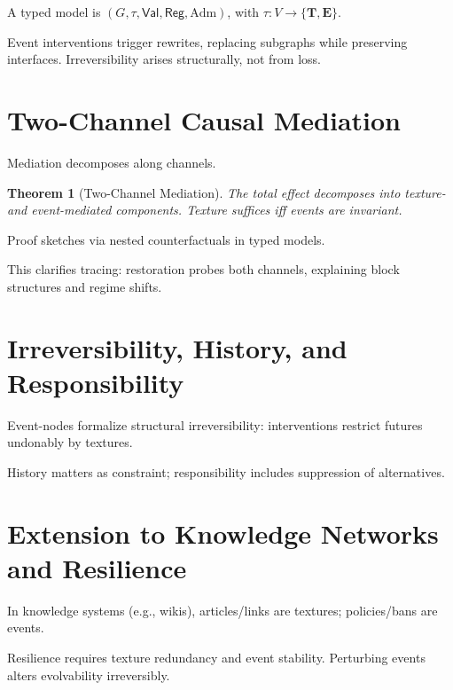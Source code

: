 \documentclass[11pt]{article}
\newtheorem{theorem}{Theorem}
\theoremstyle{remark}
\newcommand{\Adm}{\mathrm{Adm}}
\newcommand{\Val}{\mathsf{Val}}
\newcommand{\Reg}{\mathsf{Reg}}
\newcommand{\Tnode}{\mathbf{T}}
\newcommand{\Enode}{\mathbf{E}}
\begin{document}
A typed model is $(G, \tau, \Val, \Reg, \Adm)$, with $\tau: V \to \{\Tnode, \Enode\}$.

Event interventions trigger rewrites, replacing subgraphs while preserving interfaces. Irreversibility arises structurally, not from loss.

\section{Two-Channel Causal Mediation}

Mediation decomposes along channels.

\begin{theorem}[Two-Channel Mediation]
The total effect decomposes into texture- and event-mediated components. Texture suffices iff events are invariant.
\end{theorem}

Proof sketches via nested counterfactuals in typed models.

This clarifies tracing: restoration probes both channels, explaining block structures and regime shifts.

\section{Irreversibility, History, and Responsibility}

Event-nodes formalize structural irreversibility: interventions restrict futures undonably by textures.

History matters as constraint; responsibility includes suppression of alternatives.

\section{Extension to Knowledge Networks and Resilience}

In knowledge systems (e.g., wikis), articles/links are textures; policies/bans are events.

Resilience requires texture redundancy and event stability. Perturbing events alters evolvability irreversibly.

\end{document}
